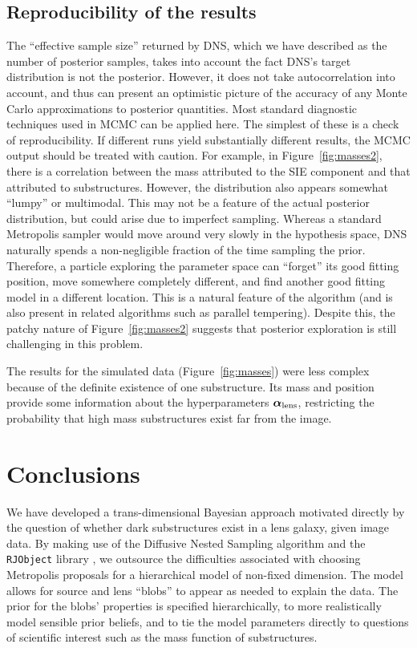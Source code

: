 \documentclass[useAMS,usenatbib]{mn2e}
\begin{document}
\subsection{Reproducibility of the results}\label{sec:convergence}
The ``effective sample size'' returned by DNS, which we have described as the
number of posterior samples, takes into account the fact DNS's target
distribution is not the posterior. However, it does not take autocorrelation
into account, and thus can present an optimistic picture of the accuracy of
any Monte Carlo approximations to posterior quantities. Most standard diagnostic
techniques used in MCMC can be applied here. The simplest of these is a
check of reproducibility. If different runs yield substantially different
results, the MCMC output should be treated with caution. For example, in
Figure~\ref{fig:masses2}, there is a correlation between the mass attributed
to the SIE component and that attributed to substructures. However, the
distribution also appears somewhat ``lumpy'' or multimodal. This may
not be a feature of the actual posterior distribution, but could arise due to
imperfect sampling. Whereas a standard Metropolis sampler would move around
very slowly in the hypothesis space, DNS naturally spends a non-negligible fraction
of the time sampling the prior. Therefore, a particle exploring the parameter
space can ``forget'' its good fitting position, move somewhere completely
different, and find another good fitting model in a different location. This
is a natural feature of the algorithm (and is also present in related
algorithms such as parallel tempering). Despite this, the patchy
nature of Figure~\ref{fig:masses2} suggests that posterior exploration is
still challenging in this problem.

The results for the simulated data (Figure~\ref{fig:masses})
were less complex because of the definite existence of one substructure.
Its mass and position provide some information about the hyperparameters
$\boldsymbol{\alpha}_{\rm lens}$, restricting the probability that
high mass substructures exist far from the image.

\section{Conclusions}
We have developed a trans-dimensional Bayesian approach motivated directly by
the question of whether dark substructures exist in a lens galaxy, given image
data. By making use of the Diffusive Nested Sampling algorithm \citep{dnest}
and the {\tt RJObject} library \citep{rjobject}, we outsource the difficulties
associated with choosing Metropolis proposals for a hierarchical model of
non-fixed dimension. The model allows for source and lens ``blobs'' to appear
as needed to explain the data. The prior for the blobs' properties is
specified hierarchically, to more realistically model sensible prior beliefs,
and to tie the model parameters directly to questions of scientific interest
such as the mass function of substructures.
\end{document}
